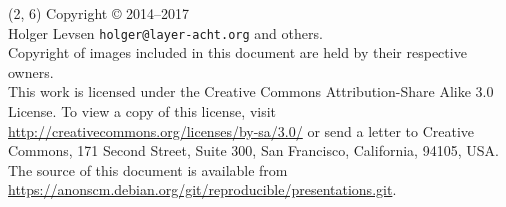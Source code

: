 \documentclass[14pt]{beamer}
\newif\ifplacelogo
\begin{document}
\placelogotrue

\begin{frame}{}
\begin{textblock}{12}(2, 6)
    \tiny{
      Copyright \copyright{} 2014--2017 \\
         Holger Levsen \texttt{holger@layer-acht.org} and others.\\[3.0mm]
      Copyright of images included in this document are held by
      their respective owners.
      \\[3.0mm]
      This work is licensed under the \alert{Creative Commons
        Attribution-Share Alike 3.0} License.  To view a copy of this
      license, visit
      \url{http://creativecommons.org/licenses/by-sa/3.0/} or send a
      letter to Creative Commons, 171 Second Street, Suite 300, San
      Francisco, California, 94105, USA.
      \\[2.0mm]
      The source of this document is available from
      \url{https://anonscm.debian.org/git/reproducible/presentations.git}.
    }
  \end{textblock}
\end{frame}
\end{document}
